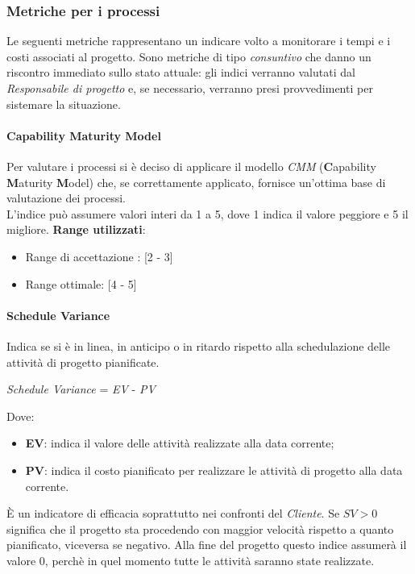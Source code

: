 \subsubsection{Metriche per i processi}
Le seguenti metriche rappresentano un indicare volto a monitorare i tempi e i costi associati al progetto. Sono metriche di tipo \textit{consuntivo} che danno un riscontro immediato sullo stato attuale: gli indici verranno valutati dal \textit{Responsabile di progetto} e, se necessario, verranno presi provvedimenti per sistemare la situazione. 

\paragraph{Capability Maturity Model}
Per valutare i processi si \`e deciso di applicare il modello \textit{CMM} (\textbf{C}apability \textbf{M}aturity \textbf{M}odel) che, se correttamente applicato, fornisce un'ottima base di valutazione dei processi. \\
L'indice pu\`o assumere valori interi da 1 a 5, dove 1 indica il valore peggiore e 5 il migliore.
\textbf{Range utilizzati}:\\
\begin{itemize}
	\item Range di accettazione : [2 - 3]
	\item Range ottimale: [4 - 5]
\end{itemize}

\paragraph{Schedule Variance}
Indica se si \`e in linea, in anticipo o in ritardo rispetto alla schedulazione delle attività di progetto
pianificate. \\
\begin{center}
	\textit{Schedule Variance} = \textit{EV} - \textit{PV} 
\end{center}
Dove:
\begin{itemize}
	\item \textbf{EV}: indica il valore delle attivit\`a realizzate alla data corrente;
	\item \textbf{PV}: indica il costo pianificato per realizzare le attività di progetto alla data corrente.
\end{itemize}
\`E un indicatore di efficacia soprattutto nei confronti del \textit{Cliente}. Se \begin{math}{SV > 0}\end{math} significa che il progetto sta procedendo con maggior velocit\`a rispetto a quanto pianificato, viceversa se negativo. Alla fine del progetto questo indice assumer\`a il valore 0, perch\`e in quel momento tutte le attivit\`a saranno state realizzate.

